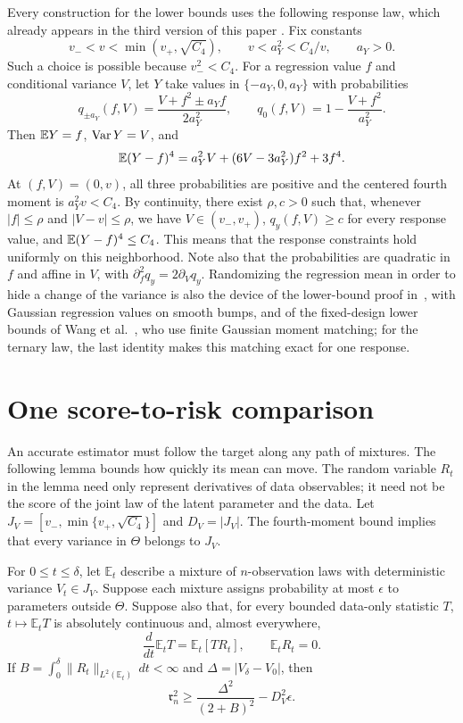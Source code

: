 Every construction for the lower bounds uses the following response
law, which already appears in the third version of this paper
\cite[Section~3, equation~(3.1)]{AronowLopatto2026v3}. Fix constants
\[
 v_-<v<\min(v_+,\sqrt{C_4}),\qquad
 v<a_Y^2<C_4/v,\qquad a_Y>0.
\]
Such a choice is possible because $v_-^2<C_4$. For a regression value $f$
and conditional variance $V$, let $Y$ take values in
$\{-a_Y,0,a_Y\}$ with probabilities
\begin{equation}\label{eq:ternary}
 q_{\pm a_Y}(f,V)
 =
 \frac{V+f^2\pm a_Yf}{2a_Y^2},
 \qquad
 q_0(f,V)
 =
 1-\frac{V+f^2}{a_Y^2}.
\end{equation}
Then $\mathbb E Y=f$, $\operatorname{Var} Y=V$, and
\[
 \mathbb E(Y-f)^4=a_Y^2V+(6V-3a_Y^2)f^2+3f^4.
\]
At $(f,V)=(0,v)$, all three probabilities are positive and the
centered fourth moment is $a_Y^2v<C_4$. By continuity, there exist
$\rho,c>0$ such that, whenever $|f|\le\rho$ and $|V-v|\le\rho$,
we have $V\in(v_-,v_+)$, $q_y(f,V)\ge c$ for every response value,
and $\mathbb E(Y-f)^4\le C_4$. This means that the response constraints hold uniformly on this
neighborhood. Note also that the probabilities are quadratic in $f$
and affine in $V$, with $\partial_f^2q_y=2\partial_Vq_y$.
Randomizing the regression mean in order to hide a change of the
variance is also the device of the lower-bound proof
in~\cite[Section~4.5]{Spokoiny2002}, with Gaussian regression values on
smooth bumps, and of the fixed-design lower bounds of Wang et
al.\ \cite[Section~6.2]{WangBrownCaiLevine2008}, who use finite Gaussian moment
matching; for the ternary law, the last identity makes this
matching exact for one response.

\section{One score-to-risk comparison}\label{sec:prelim-risk}

An accurate estimator must follow the target along any path of mixtures.
The following lemma bounds how quickly its mean can move. The random
variable $R_t$ in the lemma need only represent derivatives of data
observables; it need not be the score of the joint law of the latent
parameter and the data. Let $J_V=[v_-,\min\{v_+,\sqrt{C_4}\}]$ and
$D_V=|J_V|$. The fourth-moment bound implies that every variance in
$\Theta$ belongs to $J_V$.

\begin{lemma}\label{lem:path-risk}
For $0\le t\le\delta$, let $\mathbb E_t$ describe a mixture of
$n$-observation laws with deterministic variance $V_t\in J_V$.
Suppose each mixture assigns probability at most $\epsilon$ to
parameters outside $\Theta$. Suppose also that, for every bounded
data-only statistic $T$, $t\mapsto\mathbb E_tT$ is absolutely continuous
and, almost everywhere,
\[
 \frac d{dt}\mathbb E_tT=\mathbb E_t[TR_t],\qquad
 \mathbb E_tR_t=0.
\]
If $B=\int_0^\delta\|R_t\|_{L^2(\mathbb E_t)}\,dt<\infty$ and
$\Delta=|V_\delta-V_0|$, then
\begin{equation}\label{eq:path-risk}
 \mathfrak r_n^2\ge\frac{\Delta^2}{(2+B)^2}-D_V^2\epsilon.
\end{equation}
\end{lemma}

